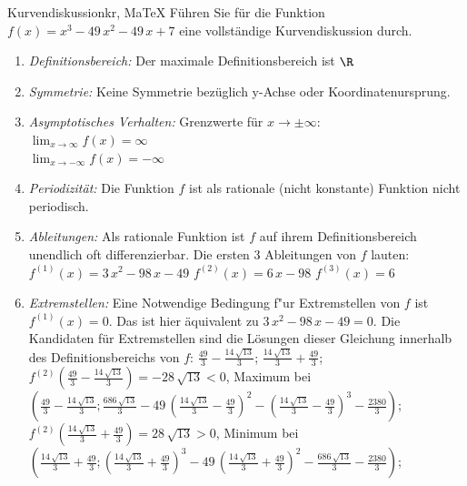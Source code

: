  \providecommand{\MoIl}{(} 
 \providecommand{\MoIr}{)}
 \providecommand{\MIntvlSep}{;} 
 \providecommand{\MElSetSep}{;} 
 \begin{MAufgabe}{Kurvendiskussion}{kr, MaTeX}
 F\"uhren Sie f\"ur die Funktion $f(x)=x^3 - 49\, x^2 - 49\, x + 7$ eine vollst\"andige Kurvendiskussion durch.\\ 
 \ifLsg\Loesung
 \begin{enumerate}
 \item \emph{Definitionsbereich:} 
 Der maximale Definitionsbereich ist $\R$\item \emph{Symmetrie:} 
 Keine Symmetrie bez\"uglich y-Achse oder Koordinatenursprung.\item \emph{Asymptotisches Verhalten:} 
 Grenzwerte f\"ur $x\rightarrow \pm \infty$: \\ 
 $\lim_{x\rightarrow \infty} f(x)=\infty$ \\ 
 $\lim_{x\rightarrow -\infty} f(x)=- \infty$ \\ 
 \item \emph{Periodizit\"at:} 
 Die Funktion $f$ ist als rationale (nicht konstante) Funktion nicht periodisch.\item \emph{Ableitungen:} 
 Als rationale Funktion ist $f$ auf ihrem Definitionsbereich unendlich oft differenzierbar. 
 Die ersten 3 Ableitungen von $f$ lauten: \\ 
 $f^{(1)}(x)=3\, x^2 - 98\, x - 49$\newline 
  $f^{(2)}(x)=6\, x - 98$\newline 
  $f^{(3)}(x)=6$\newline 
  \item \emph{Extremstellen:} 
 Eine Notwendige Bedingung f"ur Extremstellen von $f$ ist $f^{(1)}(x)=0$. 
 Das ist hier \"aquivalent zu $3\, x^2 - 98\, x - 49=0$. 
 Die Kandidaten f\"ur Extremstellen sind die L\"osungen dieser Gleichung innerhalb des Definitionsbereichs von $f$: $\frac{49}{3} - \frac{14\, \sqrt{13}}{3}$; $\frac{14\, \sqrt{13}}{3} + \frac{49}{3}$; \\ 
 $f^{(2)}(\frac{49}{3} - \frac{14\, \sqrt{13}}{3})=- 28\, \sqrt{13}$$<0$, Maximum bei $(\frac{49}{3} - \frac{14\, \sqrt{13}}{3};\frac{686\, \sqrt{13}}{3} - 49\, {\left(\frac{14\, \sqrt{13}}{3} - \frac{49}{3}\right)}^2 - {\left(\frac{14\, \sqrt{13}}{3} - \frac{49}{3}\right)}^3 - \frac{2380}{3})$; \\ 
 $f^{(2)}(\frac{14\, \sqrt{13}}{3} + \frac{49}{3})=28\, \sqrt{13}$$>0$, Minimum bei $(\frac{14\, \sqrt{13}}{3} + \frac{49}{3};{\left(\frac{14\, \sqrt{13}}{3} + \frac{49}{3}\right)}^3 - 49\, {\left(\frac{14\, \sqrt{13}}{3} + \frac{49}{3}\right)}^2 - \frac{686\, \sqrt{13}}{3} - \frac{2380}{3})$; \\ 

\end{enumerate}
\end{MAufgabe}
